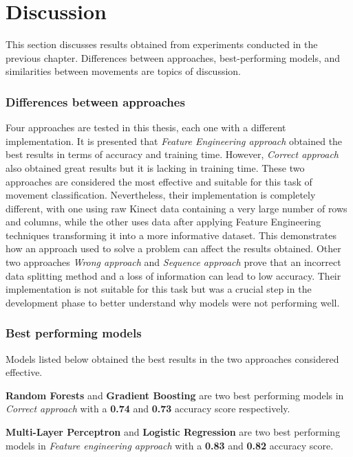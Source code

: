 \section{Discussion}
        
        This section discusses results obtained from experiments conducted in the previous chapter. Differences between approaches, best-performing models, and similarities between movements are topics of discussion. 

        \subsubsection{Differences between approaches}
            Four approaches are tested in this thesis, each one with a different implementation. It is presented that \textit{Feature Engineering approach} obtained the best results in terms of accuracy and training time. However, \textit{Correct approach} also obtained great results but it is lacking in training time. These two approaches are considered the most effective and suitable for this task of movement classification. Nevertheless, their implementation is completely different, with one using raw Kinect data containing a very large number of rows and columns, while the other uses data after applying Feature Engineering techniques transforming it into a more informative dataset. This demonstrates how an approach used to solve a problem can affect the results obtained. Other two approaches \textit{Wrong approach} and \textit{Sequence approach} prove that an incorrect data splitting method and a loss of information can lead to low accuracy. Their implementation is not suitable for this task but was a crucial step in the development phase to better understand why models were not performing well. 

        \subsubsection{Best performing models}
            Models listed below obtained the best results in the two approaches considered effective. 

            \begin{boxlabel}
                \item \textbf{Random Forests} and \textbf{Gradient Boosting} are two best performing models in \textit{Correct approach} with a \textbf{0.74} and \textbf{0.73} accuracy score respectively.
                \item \textbf{Multi-Layer Perceptron} and \textbf{Logistic Regression} are two best performing models in \textit{Feature engineering approach} with a \textbf{0.83} and \textbf{0.82} accuracy score.
            \end{boxlabel}


